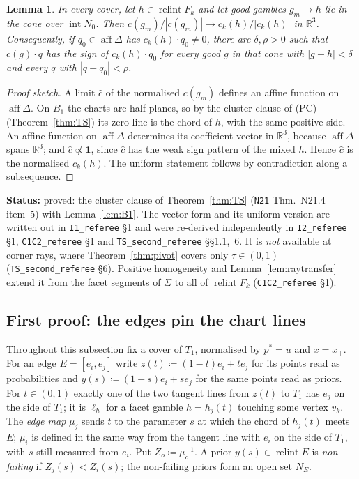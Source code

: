 \documentclass[11pt]{article}
\newtheorem{lemma}[theorem]{Lemma}
\theoremstyle{definition}
\theoremstyle{remark}
\newcommand{\R}{\mathbb R}
\newcommand{\one}{\mathbf 1}
\newcommand{\relint}{\operatorname{relint}}
\newcommand{\aff}{\operatorname{aff}}
\newcommand{\src}[1]{\texttt{#1}}
\newcommand{\status}[1]{\par\smallskip\noindent\textbf{Status:} #1\par\smallskip}
\begin{document}
\begin{lemma}\label{lem:veccluster}
In every cover, let $h\in\relint F_k$ and let good gambles $g_m\to h$ lie in the cone over $\operatorname{int}N_0$. Then $c(g_m)/|c(g_m)|\to c_k(h)/|c_k(h)|$ in $\R^3$. Consequently, if $q_0\in\aff\Delta$ has $c_k(h)\cdot q_0\ne0$, there are $\delta,\rho>0$ such that $c(g)\cdot q$ has the sign of $c_k(h)\cdot q_0$ for every good $g$ in that cone with $|g-h|<\delta$ and every $q$ with $|q-q_0|<\rho$.
\end{lemma}
\begin{proof}[Proof sketch]
A limit $\hat c$ of the normalised $c(g_m)$ defines an affine function on $\aff\Delta$. On $B_1$ the charts are half-planes, so by the cluster clause of (PC) (Theorem~\ref{thm:TS}) its zero line is the chord of $h$, with the same positive side. An affine function on $\aff\Delta$ determines its coefficient vector in $\R^3$, because $\aff\Delta$ spans $\R^3$; and $\hat c\not\propto\one$, since $\hat c$ has the weak sign pattern of the mixed $h$. Hence $\hat c$ is the normalised $c_k(h)$. The uniform statement follows by contradiction along a subsequence.
\end{proof}
\status{proved: the cluster clause of Theorem~\ref{thm:TS} (\src{N21} Thm.~N21.4 item~5) with Lemma~\ref{lem:B1}. The vector form and its uniform version are written out in \src{I1\_referee} \S1 and were re-derived independently in \src{I2\_referee} \S1, \src{C1C2\_referee} \S1 and \src{TS\_second\_referee} \S\S1.1,~6. It is \emph{not} available at corner rays, where Theorem~\ref{thm:pivot} covers only $\tau\in(0,1)$ (\src{TS\_second\_referee} \S6). Positive homogeneity and Lemma~\ref{lem:raytransfer} extend it from the facet segments of $\Sigma$ to all of $\relint F_k$ (\src{C1C2\_referee} \S1).}

\subsection{First proof: the edges pin the chart lines}\label{sec:gm-I1}

Throughout this subsection fix a cover of $T_1$, normalised by $p^*=u$ and $x=x_+$. For an edge $E=[e_i,e_j]$ write $z(t)\coloneqq(1-t)e_i+te_j$ for its points read as probabilities and $y(s)\coloneqq(1-s)e_i+se_j$ for the same points read as priors. For $t\in(0,1)$ exactly one of the two tangent lines from $z(t)$ to $T_1$ has $e_j$ on the side of $T_1$; it is $\ell_h$ for a facet gamble $h=h_j(t)$ touching some vertex $v_k$. The \emph{edge map} $\mu_j$ sends $t$ to the parameter $s$ at which the chord of $h_j(t)$ meets $E$; $\mu_i$ is defined in the same way from the tangent line with $e_i$ on the side of $T_1$, with $s$ still measured from $e_i$. Put $Z_o\coloneqq\mu_o^{-1}$. A prior $y(s)\in\relint E$ is \emph{non-failing} if $Z_j(s)<Z_i(s)$; the non-failing priors form an open set $N_E$.
\end{document}
